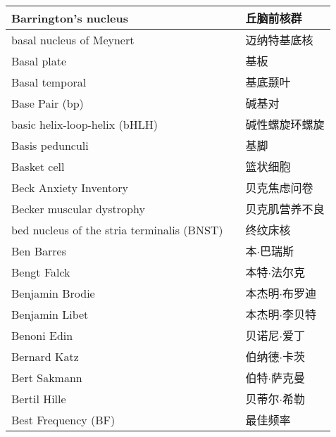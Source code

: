\begin{longtable}{lll}
	\midrule
	Barrington’s nucleus   && 丘脑前核群   \\
	
	\midrule
	basal nucleus of Meynert   && 迈纳特基底核  \\
	
	\midrule
	Basal plate   && 基板  \\
	
	\midrule
	Basal temporal   && 基底颞叶  \\
	
	\midrule
	Base Pair (bp)  && 碱基对  \\
	
	\midrule
	basic helix-loop-helix (bHLH)  && 碱性螺旋环螺旋  \\
	
	\midrule
	Basis pedunculi   && 基脚  \\
	
	\midrule
	Basket cell   && 篮状细胞  \\
	
	\midrule
	Beck Anxiety Inventory   && 贝克焦虑问卷  \\
	
	\midrule
	Becker muscular dystrophy   && 贝克肌营养不良  \\
	
	\midrule
	bed nucleus of the stria terminalis (BNST)  && 终纹床核  \\
	
	\midrule
	Ben Barres   && 本$\cdot$巴瑞斯  \\
	
	\midrule
	Bengt Falck   && 本特$\cdot$法尔克  \\
	
	\midrule
	Benjamin Brodie   && 本杰明$\cdot$布罗迪  \\
	
	\midrule
	Benjamin Libet   && 本杰明$\cdot$李贝特  \\
	
	\midrule
	Benoni Edin   && 贝诺尼$\cdot$爱丁  \\
	
	\midrule
	Bernard Katz   && 伯纳德$\cdot$卡茨  \\
	
	\midrule
	Bert Sakmann   && 伯特$\cdot$萨克曼  \\
	
	\midrule
	Bertil Hille   && 贝蒂尔$\cdot$希勒  \\
 
	\midrule
	Best Frequency (BF)     && 最佳频率   \\
	

\end{longtable}
